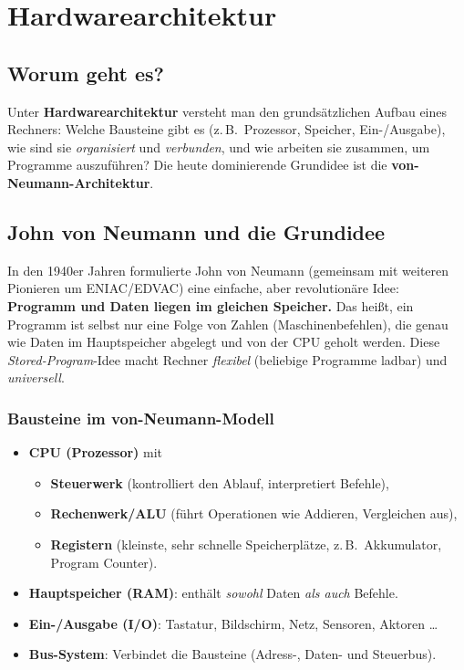 \documentclass[../skript/main.tex]{subfiles}
\begin{document}
\label{chap:hardwarearchitektur}
\chapter{Hardwarearchitektur}

\section{Worum geht es?}
Unter \textbf{Hardwarearchitektur} versteht man den grundsätzlichen Aufbau eines Rechners:
Welche Bausteine gibt es (z.\,B.\ Prozessor, Speicher, Ein-/Ausgabe), wie sind sie
\emph{organisiert} und \emph{verbunden}, und wie arbeiten sie zusammen, um Programme auszuführen?
Die heute dominierende Grundidee ist die \textbf{von-Neumann-Architektur}.

\section{John von Neumann und die Grundidee}
In den 1940er Jahren formulierte John von Neumann (gemeinsam mit weiteren Pionieren um ENIAC/EDVAC)
eine einfache, aber revolutionäre Idee: \textbf{Programm und Daten liegen im gleichen Speicher.}
Das heißt, ein Programm ist selbst nur eine Folge von Zahlen (Maschinenbefehlen), die genau wie Daten
im Hauptspeicher abgelegt und von der CPU geholt werden. Diese \emph{Stored-Program}-Idee macht
Rechner \emph{flexibel} (beliebige Programme ladbar) und \emph{universell}.

\subsection*{Bausteine im von-Neumann-Modell}
\begin{itemize}
	\item \textbf{CPU (Prozessor)} mit
	\begin{itemize}
		\item \textbf{Steuerwerk} (kontrolliert den Ablauf, interpretiert Befehle),
		\item \textbf{Rechenwerk/ALU} (führt Operationen wie Addieren, Vergleichen aus),
		\item \textbf{Registern} (kleinste, sehr schnelle Speicherplätze, z.\,B.\ Akkumulator, Program Counter).
	\end{itemize}
	\item \textbf{Hauptspeicher (RAM)}: enthält \emph{sowohl} Daten \emph{als auch} Befehle.
	\item \textbf{Ein-/Ausgabe (I/O)}: Tastatur, Bildschirm, Netz, Sensoren, Aktoren \dots
	\item \textbf{Bus-System}: Verbindet die Bausteine (Adress-, Daten- und Steuerbus).
\end{itemize}
\end{document}

